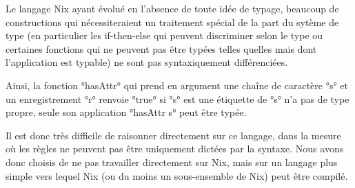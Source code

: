 Le langage Nix ayant évolué en l'absence de toute idée de typage, beaucoup de
constructions qui nécessiteraient un traitement spécial de la part du sytème de
type (en particulier les if-then-else qui peuvent discriminer selon le type ou
certaines fonctions qui ne peuvent pas être typées telles quelles mais dont
l'application est typable) ne sont pas syntaxiquement différenciées.

Ainsi, la fonction °hasAttr° qui prend en argument une chaîne de caractère °s°
et un enregistrement °r° renvoie °true° si °s° est une étiquette de °s° n'a pas
de type propre, seule son application °hasAttr s° peut être typée.

Il est donc très difficile de raisonner directement sur ce langage, dans la
mesure où les règles ne peuvent pas être uniquement dictées par la syntaxe.
Nous avons donc choisis de ne pas travailler directement sur Nix, mais sur un
langage plus simple vers lequel Nix (ou du moins un sous-ensemble de Nix) peut
être compilé.
